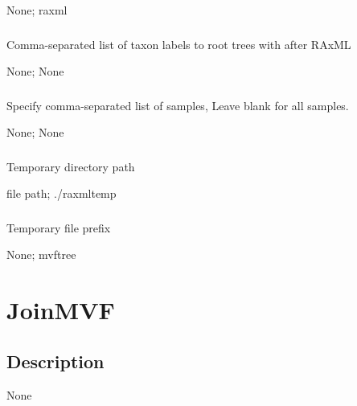 \documentclass[letterpaper,11pt,english]{sphinxmanual}
\begin{document}
 None;  raxml


\subsubsection{}
\label{\detokenize{prog_desc:root-with-rootwith}}
 Comma-separated list of taxon labels to root trees with after RAxML

 None;  None


\subsubsection{}
\label{\detokenize{prog_desc:id113}}
 Specify comma-separated list of samples, Leave blank for all samples.

 None;  None


\subsubsection{}
\label{\detokenize{prog_desc:id114}}
 Temporary directory path

 file path;  ./raxmltemp


\subsubsection{}
\label{\detokenize{prog_desc:temp-prefix-tempprefix}}
 Temporary file prefix

 None;  mvftree


\section{JoinMVF}
\label{\detokenize{prog_desc:joinmvf}}

\subsection{Description}
\label{\detokenize{prog_desc:id115}}
None
\end{document}
